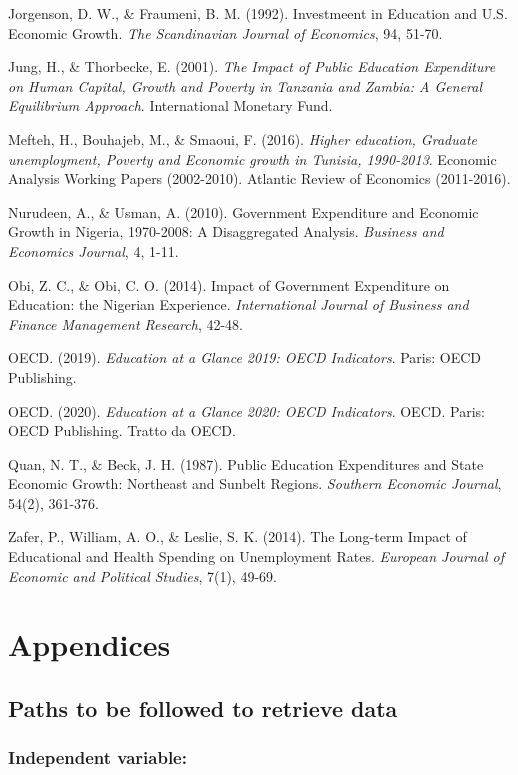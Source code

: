 \documentclass[
]{article}
\begin{document}
Jorgenson, D. W., \& Fraumeni, B. M. (1992). Investmeent in Education
and U.S. Economic Growth. \emph{The Scandinavian Journal of Economics},
94, 51-70.

Jung, H., \& Thorbecke, E. (2001). \emph{The Impact of Public Education
Expenditure on Human Capital, Growth and Poverty in Tanzania and Zambia:
A General Equilibrium Approach}. International Monetary Fund.

Mefteh, H., Bouhajeb, M., \& Smaoui, F. (2016). \emph{Higher education,
Graduate unemployment, Poverty and Economic growth in Tunisia,
1990-2013}. Economic Analysis Working Papers (2002-2010). Atlantic
Review of Economics (2011-2016).

Nurudeen, A., \& Usman, A. (2010). Government Expenditure and Economic
Growth in Nigeria, 1970-2008: A Disaggregated Analysis. \emph{Business
and Economics Journal}, 4, 1-11.

Obi, Z. C., \& Obi, C. O. (2014). Impact of Government Expenditure on
Education: the Nigerian Experience. \emph{International Journal of
Business and Finance Management Research}, 42-48.

OECD. (2019). \emph{Education at a Glance 2019: OECD Indicators}. Paris:
OECD Publishing.

OECD. (2020). \emph{Education at a Glance 2020: OECD Indicators}. OECD.
Paris: OECD Publishing. Tratto da OECD.

Quan, N. T., \& Beck, J. H. (1987). Public Education Expenditures and
State Economic Growth: Northeast and Sunbelt Regions. \emph{Southern
Economic Journal}, 54(2), 361-376.

Zafer, P., William, A. O., \& Leslie, S. K. (2014). The Long-term Impact
of Educational and Health Spending on Unemployment Rates. \emph{European
Journal of Economic and Political Studies}, 7(1), 49-69.

\hypertarget{appendices}{%
\section{Appendices}\label{appendices}}

\hypertarget{paths-to-be-followed-to-retrieve-data}{%
\subsection{Paths to be followed to retrieve
data}\label{paths-to-be-followed-to-retrieve-data}}

\hypertarget{independent-variable}{%
\subsubsection{Independent variable:}\label{independent-variable}}
\end{document}
